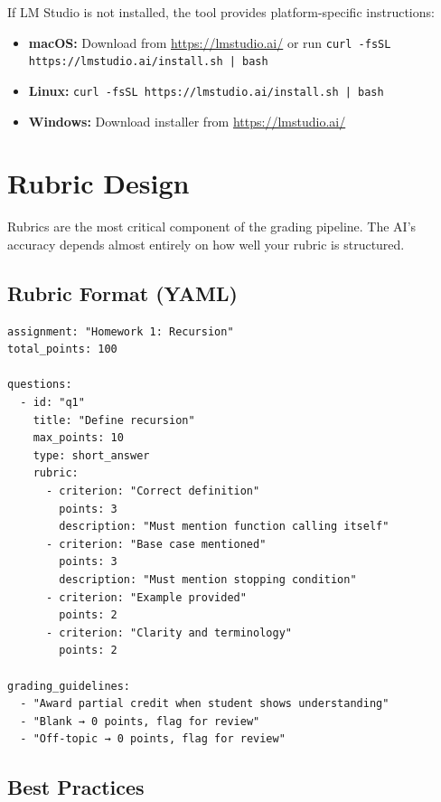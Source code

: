 \documentclass[11pt,a4paper]{article}
\begin{document}
If LM Studio is not installed, the tool provides platform-specific instructions:

\begin{itemize}[itemsep=2pt]
    \item \textbf{macOS:} Download from \url{https://lmstudio.ai/} or run \texttt{curl -fsSL https://lmstudio.ai/install.sh | bash}
    \item \textbf{Linux:} \texttt{curl -fsSL https://lmstudio.ai/install.sh | bash}
    \item \textbf{Windows:} Download installer from \url{https://lmstudio.ai/}
\end{itemize}

\section{Rubric Design}

Rubrics are the most critical component of the grading pipeline. The AI's accuracy depends almost entirely on how well your rubric is structured.

\subsection{Rubric Format (YAML)}

\begin{lstlisting}[style=yamlstyle]
assignment: "Homework 1: Recursion"
total_points: 100

questions:
  - id: "q1"
    title: "Define recursion"
    max_points: 10
    type: short_answer
    rubric:
      - criterion: "Correct definition"
        points: 3
        description: "Must mention function calling itself"
      - criterion: "Base case mentioned"
        points: 3
        description: "Must mention stopping condition"
      - criterion: "Example provided"
        points: 2
      - criterion: "Clarity and terminology"
        points: 2

grading_guidelines:
  - "Award partial credit when student shows understanding"
  - "Blank → 0 points, flag for review"
  - "Off-topic → 0 points, flag for review"
\end{lstlisting}

\subsection{Best Practices}
\end{document}

